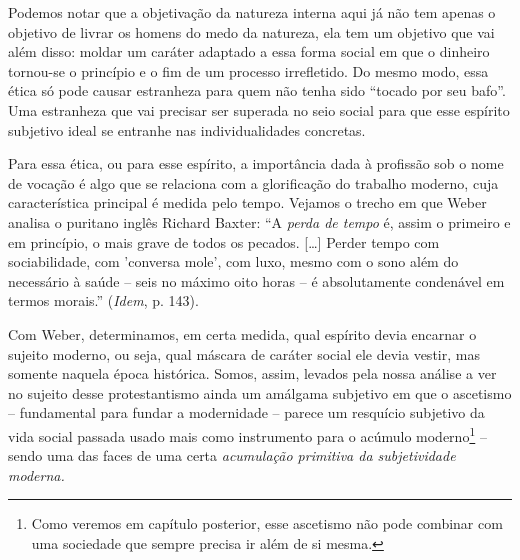 Podemos notar que a objetivação da natureza interna aqui já não tem
apenas o objetivo de livrar os homens do medo da natureza, ela tem um
objetivo que vai além disso: moldar um caráter adaptado a essa forma
social em que o dinheiro tornou-se o princípio e o fim de um processo
irrefletido. Do mesmo modo, essa ética só pode causar estranheza para
quem não tenha sido ``tocado por seu bafo''. Uma estranheza que vai
precisar ser superada no seio social para que esse espírito subjetivo
ideal se entranhe nas individualidades concretas.

Para essa ética, ou para esse espírito, a importância dada à profissão
sob o nome de vocação é algo que se relaciona com a glorificação do
trabalho moderno, cuja característica principal é medida pelo tempo.
Vejamos o trecho em que Weber analisa o puritano inglês Richard Baxter:
``A \emph{perda de tempo} é, assim o primeiro e em princípio, o mais
grave de todos os pecados. {[}\ldots{}{]} Perder tempo com
sociabilidade, com 'conversa mole', com luxo, mesmo com o sono além do
necessário à saúde -- seis no máximo oito horas -- é absolutamente
condenável em termos morais.'' (\emph{Idem}, p. 143).

Com Weber, determinamos, em certa medida, qual espírito devia encarnar o
sujeito moderno, ou seja, qual máscara de caráter social ele devia
vestir, mas somente naquela época histórica. Somos, assim, levados pela
nossa análise a ver no sujeito desse protestantismo ainda um amálgama
subjetivo em que o ascetismo -- fundamental para fundar a modernidade --
parece um resquício subjetivo da vida social passada usado mais como
instrumento para o acúmulo moderno\footnote{Como veremos em capítulo
  posterior, esse ascetismo não pode combinar com uma sociedade que
  sempre precisa ir além de si mesma.} -- sendo uma das faces de uma
certa \emph{acumulação primitiva da subjetividade moderna.}

